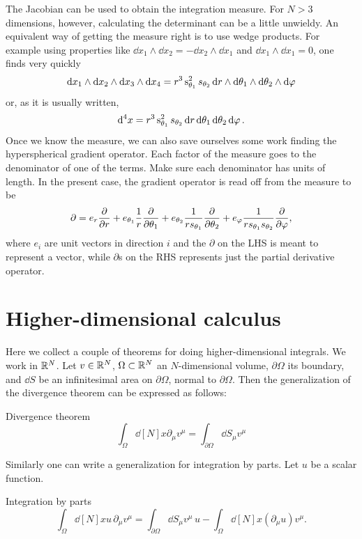 The Jacobian can be used to obtain the integration measure. For $N>3$
dimensions, however, calculating the determinant can be a little
unwieldy. An equivalent way of getting the measure right is to
use wedge products. For example using properties like
$\dd{x_1}\wedge\dd{x_2}=-\dd{x_2}
  \wedge\dd{x_1}$ and $\dd{x_1}\wedge\dd{x_1}=0$, 
one finds very quickly
\begin{equation}
  \dd{x_1}\wedge\dd{x_2}\wedge\dd{x_3}\wedge\dd{x_4}
   =r^3\operatorname{s}_{\theta_1}^2s_{\theta_2} 
     \dd{r}\wedge\dd{\theta_1}\wedge\dd{\theta_2}\wedge\dd{\varphi}
\end{equation}
or, as it is usually written,
\begin{equation}
  \dd[4]{x}=r^3\operatorname{s}_{\theta_1}^2s_{\theta_2}
             \dd{r}\dd{\theta_1}\dd{\theta_2}\dd{\varphi}.
\end{equation}
Once we know the measure, we can also save ourselves some work
finding the hyperspherical gradient operator. Each factor of the
measure goes to the denominator of one of the terms. Make sure
each denominator has units of length. In the present case, the
gradient operator is read off from the measure to be
\begin{equation}\label{eq:4dgrad}
  \partial=e_r\pdv{r}
   +e_{\theta_1}\frac{1}{r}\pdv{\theta_1}
   +e_{\theta_2}\frac{1}{rs_{\theta_1}}\pdv{\theta_2}
   +e_\varphi\frac{1}{rs_{\theta_1}s_{\theta_2}}\pdv{\varphi},
\end{equation}
where $e_i$ are unit vectors in direction $i$ and the $\partial$ on
the LHS is meant to represent a vector, while $\partial$s on the RHS
represents just the partial derivative operator.


\section{Higher-dimensional calculus}

Here we collect a couple of theorems for doing higher-dimensional integrals.
We work in $\mathbb{R}^N$. Let $v\in\mathbb{R}^N$, $\Omega\subset\mathbb{R}^N$ an $N$-dimensional
volume, $\partial\Omega$ its boundary, and $\dd S$ be an infinitesimal area
on $\partial\Omega$, normal to $\partial\Omega$. Then the generalization
of the divergence theorem can be expressed as follows:
\begin{theorem}{Divergence theorem}{}
$$
\int_\Omega\dd[N]{x}\partial_\mu v^\mu
=\int_{\partial\Omega}\dd {S_\mu} v^\mu
$$
\end{theorem}

Similarly one can write a generalization for integration by
parts. Let $u$ be a scalar function.
\begin{theorem}{Integration by parts}{}
$$
\int_\Omega\dd[N]{x}u\,\partial_\mu v^\mu
=\int_{\partial\Omega}\dd {S_\mu} v^\mu\, u
-\int_\Omega\dd[N]{x}\left(\partial_\mu u\right) v^\mu.
$$
\end{theorem}

